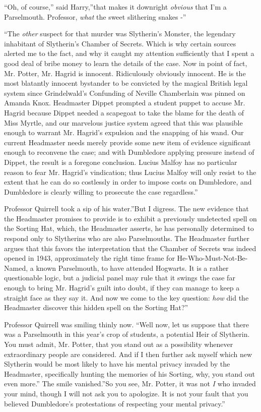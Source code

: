 ``Oh, of course,'' said Harry,''that makes it downright \emph{obvious}
that I'm a Parselmouth. Professor, \emph{what} the sweet slithering
snakes -''

``The \emph{other} suspect for that murder was Slytherin's Monster, the
legendary inhabitant of Slytherin's Chamber of Secrets. Which is why
certain sources alerted me to the fact, and why it caught my attention
sufficiently that I spent a good deal of bribe money to learn the
details of the case. Now in point of fact, Mr. Potter, Mr. Hagrid is
innocent. Ridiculously obviously innocent. He is the most blatantly
innocent bystander to be convicted by the magical British legal system
since Grindelwald's Confunding of Neville Chamberlain was pinned on
Amanda Knox. Headmaster Dippet prompted a student puppet to accuse Mr.
Hagrid because Dippet needed a scapegoat to take the blame for the death
of Miss Myrtle, and our marvelous justice system agreed that this was
plausible enough to warrant Mr. Hagrid's expulsion and the snapping of
his wand. Our current Headmaster needs merely provide some new item of
evidence significant enough to reconvene the case; and with Dumbledore
applying pressure instead of Dippet, the result is a foregone
conclusion. Lucius Malfoy has no particular reason to fear Mr. Hagrid's
vindication; thus Lucius Malfoy will only resist to the extent that he
can do so costlessly in order to impose costs on Dumbledore, and
Dumbledore is clearly willing to prosecute the case regardless.''

Professor Quirrell took a sip of his water.''But I digress. The new
evidence that the Headmaster promises to provide is to exhibit a
previously undetected spell on the Sorting Hat, which, the Headmaster
asserts, he has personally determined to respond only to Slytherins who
are also Parselmouths. The Headmaster further argues that this favors
the interpretation that the Chamber of Secrets was indeed opened in
1943, approximately the right time frame for He-Who-Must-Not-Be-Named, a
known Parselmouth, to have attended Hogwarts. It is a rather
questionable logic, but a judicial panel may rule that it swings the
case far enough to bring Mr. Hagrid's guilt into doubt, if they can
manage to keep a straight face as they say it. And now we come to the
key question: \emph{how} did the Headmaster discover this hidden spell
on the Sorting Hat?''

Professor Quirrell was smiling thinly now. ``Well now, let us suppose
that there was a Parselmouth in this year's crop of students, a
potential Heir of Slytherin. You must admit, Mr. Potter, that you stand
out as a possibility whenever extraordinary people are considered. And
if I then further ask myself which new Slytherin would be most likely to
have his mental privacy invaded by the Headmaster, specifically hunting
the memories of his Sorting, why, you stand out even more.'' The smile
vanished.''So you see, Mr. Potter, it was not \emph{I} who invaded your
mind, though I will not ask you to apologize. It is not your fault that
you believed Dumbledore's protestations of respecting your mental
privacy.''

